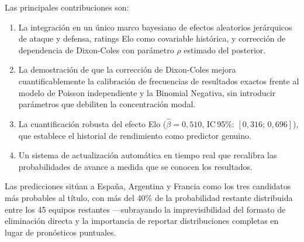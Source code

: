 \documentclass[12pt,a4paper]{article}
\begin{document}
Las principales contribuciones son:
\begin{enumerate}
  \item La integración en un único marco bayesiano de efectos aleatorios
        jerárquicos de ataque y defensa, ratings Elo como covariable histórica,
        y corrección de dependencia de Dixon-Coles con parámetro $\rho$ estimado
        del posterior.
  \item La demostración de que la corrección de Dixon-Coles mejora
        cuantificablemente la calibración de frecuencias de resultados exactos
        frente al modelo de Poisson independiente y la Binomial Negativa,
        sin introducir parámetros que debiliten la concentración modal.
  \item La cuantificación robusta del efecto Elo
        ($\hat{\beta} = 0{,}510$, IC\,95\%: $[0{,}316;\, 0{,}696]$),
        que establece el historial de rendimiento como predictor genuino.
  \item Un sistema de actualización automática en tiempo real que recalibra
        las probabilidades de avance a medida que se conocen los resultados.
\end{enumerate}

Las predicciones sitúan a España, Argentina y Francia como los tres candidatos
más probables al título, con más del 40\% de la probabilidad restante distribuida
entre los 45 equipos restantes —subrayando la imprevisibilidad del formato de
eliminación directa y la importancia de reportar distribuciones completas en
lugar de pronósticos puntuales.
\end{document}
